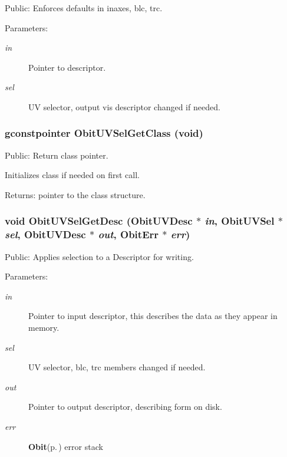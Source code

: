 Public: Enforces defaults in inaxes, blc, trc. 

\begin{Desc}
\item[Parameters:]
\begin{description}
\item[{\em in}]Pointer to descriptor. \item[{\em sel}]UV selector, output vis descriptor changed if needed. \end{description}
\end{Desc}
\subsubsection{\setlength{\rightskip}{0pt plus 5cm}gconstpointer Obit\-UVSel\-Get\-Class (void)}\label{ObitUVSel_8c_a8}


Public: Return class pointer. 

Initializes class if needed on first call. \begin{Desc}
\item[Returns:]pointer to the class structure. \end{Desc}
\subsubsection{\setlength{\rightskip}{0pt plus 5cm}void Obit\-UVSel\-Get\-Desc ({\bf Obit\-UVDesc} $\ast$ {\em in}, {\bf Obit\-UVSel} $\ast$ {\em sel}, {\bf Obit\-UVDesc} $\ast$ {\em out}, {\bf Obit\-Err} $\ast$ {\em err})}\label{ObitUVSel_8c_a12}


Public: Applies selection to a Descriptor for writing. 

\begin{Desc}
\item[Parameters:]
\begin{description}
\item[{\em in}]Pointer to input descriptor, this describes the data as they appear in memory. \item[{\em sel}]UV selector, blc, trc members changed if needed. \item[{\em out}]Pointer to output descriptor, describing form on disk. \item[{\em err}]{\bf Obit}{\rm (p.\,\pageref{structObit})} error stack \end{description}
\end{Desc}
